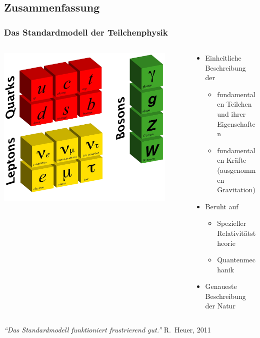 \documentclass{beamer}
\begin{document}
\subsection{Zusammenfassung}
\begin{frame}
  \frametitle{Das Standardmodell der Teilchenphysik}
  \begin{columns}
    \begin{column}{0.5\textwidth}
      \begin{center}
        \includegraphics[width=0.9\textwidth]{sm/sm_blocks_wo_higgs.jpg}
      \end{center}
    \end{column}
    \begin{column}{0.5\textwidth}
      \begin{itemize}
      \item Einheitliche Beschreibung der
        \begin{itemize}
        \item fundamentalen Teilchen und ihrer Eigenschaften
        \item fundamentalen Kr\"afte (ausgenommen
          Gravitation)
        \end{itemize}
      \item Beruht auf
        \begin{itemize}
        \item Spezieller Relativit\"atstheorie
        \item Quantenmechanik
        \end{itemize}
      \item Genaueste Beschreibung der Natur
      \end{itemize}
   \end{column}
  \end{columns}
  \pause
  \vskip0.5cm
  \begin{block}{}
    \begin{center}
      \textit{``Das Standardmodell funktioniert frustrierend gut.''}
      {\scriptsize R.~Heuer, 2011}
    \end{center}
  \end{block}
\end{frame}
\end{document}

